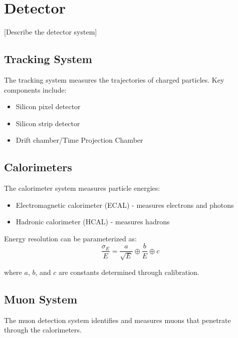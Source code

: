 \section{Detector}
\label{sec:EXPERIMENT_DETECTOR}

[Describe the detector system]

\subsection{Tracking System}
\label{sec:EXPERIMENT_DETECTOR_TRACKING_SYSTEM}

The tracking system measures the trajectories of charged particles. Key components include:
\begin{itemize}
  \item Silicon pixel detector
  \item Silicon strip detector
  \item Drift chamber/Time Projection Chamber
\end{itemize}

\subsection{Calorimeters}
\label{sec:EXPERIMENT_DETECTOR_CALORIMETERS}

The calorimeter system measures particle energies:
\begin{itemize}
  \item Electromagnetic calorimeter (ECAL) - measures electrons and photons
  \item Hadronic calorimeter (HCAL) - measures hadrons
\end{itemize}

Energy resolution can be parameterized as:
\begin{equation}
  \frac{\sigma_E}{E} = \frac{a}{\sqrt{E}} \oplus \frac{b}{E} \oplus c
  \label{eq:energy-resolution}
\end{equation}

where $a$, $b$, and $c$ are constants determined through calibration.

\subsection{Muon System}
\label{sec:EXPERIMENT_DETECTOR_MUON_SYSTEM}

The muon detection system identifies and measures muons that penetrate through the calorimeters.

